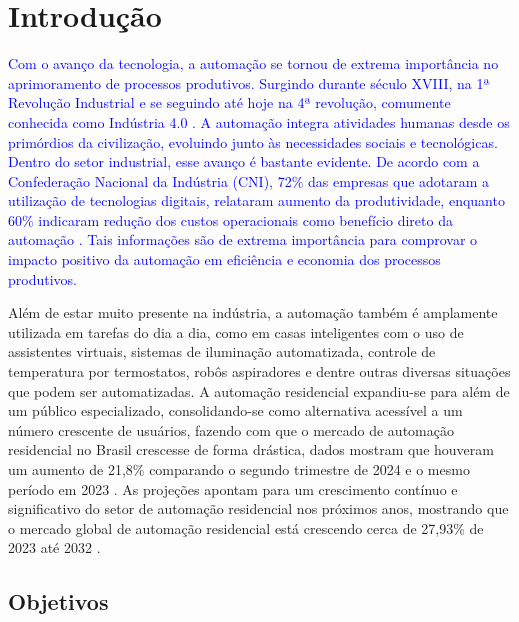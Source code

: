 \chapter{Introdução}

\textcolor{blue}{Com o avanço da tecnologia, a automação se tornou de extrema importância no aprimoramento de processos produtivos. Surgindo durante século XVIII, na 1ª Revolução Industrial e se seguindo até hoje na 4ª revolução, comumente conhecida como Indústria 4.0 \cite{automacao}. A automação integra atividades humanas desde os primórdios da civilização, evoluindo junto às necessidades sociais e tecnológicas. Dentro do setor industrial, esse avanço é bastante evidente. De acordo com a Confederação Nacional da Indústria (CNI), 72\% das empresas que adotaram a utilização de tecnologias digitais, relataram aumento da produtividade, enquanto 60\% indicaram redução dos custos operacionais como benefício direto da automação \cite{CNI}. Tais informações são de extrema importância para comprovar o impacto positivo da automação em eficiência e economia dos processos produtivos.}

Além de estar muito presente na indústria, a automação também é amplamente utilizada em tarefas do dia a dia, como em casas inteligentes com o uso de assistentes virtuais, sistemas de iluminação automatizada, controle de temperatura por termostatos, robôs aspiradores e dentre outras diversas situações que podem ser automatizadas. A automação residencial expandiu-se para além de um público especializado, consolidando-se como alternativa acessível a um número crescente de usuários, fazendo com que o mercado de automação residencial no Brasil crescesse de forma drástica, dados mostram que houveram um aumento de 21,8\% comparando o segundo trimestre de 2024 e o mesmo período em 2023 \cite{cresceuBR}. As projeções apontam para um crescimento contínuo e significativo do setor de automação residencial nos próximos anos, mostrando que o mercado global de automação residencial está crescendo cerca de 27,93\% de 2023 até 2032 \cite{aumentoAosAnos}.



\section{Objetivos}

